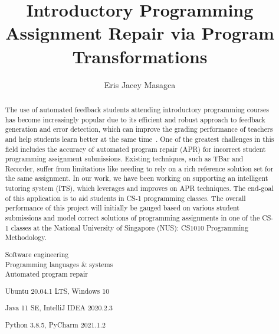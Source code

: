 \documentclass[fyp,12pt]{socreport}
\newcommand{\itab}[1]{\hspace{0em}\rlap{#1}}
\newcommand{\tab}[1]{\hspace{.11\textwidth}\rlap{#1}}
\begin{document}

\title{Introductory Programming Assignment Repair via Program Transformations}
\author{Eris Jacey Masagca}
\deliverables{
    \item \itab{Report:} \tab{1 Volume}
}
\maketitle

\begin{abstract}

The use of automated feedback students attending introductory programming courses has become
increasingly popular due to its efficient and robust approach to feedback generation and error
detection, which can improve the grading performance of teachers and help students learn better
at the same time~\cite{haldeman2021automated}.
One of the greatest challenges in this field includes the accuracy of automated program repair (APR)
for incorrect student programming assignment submissions.
Existing techniques, such as TBar and Recorder, suffer from limitations like needing to rely on
a rich reference solution set for the same assignment.
In our work, we have been working on supporting an intelligent tutoring system (ITS), which
leverages and improves on APR techniques.
The end-goal of this application is to aid students in CS-1 programming classes.
The overall performance of this project will initially be gauged based on various student submissions
and model correct solutions of programming assignments in one of the CS-1 classes at the National
University of Singapore (NUS): CS1010 Programming Methodology.

\begin{keywords}
    Software engineering \\
    Programming languages \& systems \\
    Automated program repair
\end{keywords}

\begin{implement}
    \item{Ubuntu 20.04.1 LTS, Windows 10}
    \item{Java 11 SE, IntelliJ IDEA 2020.2.3}
    \item{Python 3.8.5, PyCharm 2021.1.2}
\end{implement}

\end{abstract}
\end{document}
